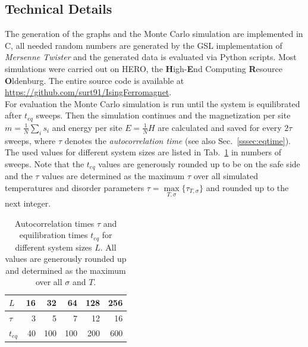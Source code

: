 \subsection{Technical Details}
    The generation of the graphs and the Monte Carlo simulation are implemented
    in C, all needed random numbers are generated by the GSL \cite{GSL}
    implementation of \emph{Mersenne Twister} \cite{Matsumoto1998} and
    the generated data is evaluated via Python scripts.
    Most simulations were carried out on HERO, the \textbf{H}igh-\textbf{E}nd
    Computing \textbf{R}esource \textbf{O}ldenburg.
    The entire source code is available at \url{https://github.com/surt91/IsingFerromagnet}.\\

    For evaluation the Monte Carlo simulation is run until the system
    is equilibrated after \(t_{eq}\) sweeps. Then the simulation continues
    and the magnetization per site \(m=\frac{1}{N}\sum_i s_i\) and energy
    per site \(E=\frac{1}{N} H\) are calculated and saved for every
    \(2\tau\) sweeps, where \(\tau\) denotes the \emph{autocorrelation time}
    (see also Sec.\ \ref{sssec:eqtime}). The used values for different system sizes
    are listed in Tab.\ \ref{tab:tauAndTeq} in numbers of sweeps. Note that
    the \(t_{eq}\) values are generously rounded up to be on the safe side
    and the \(\tau\) values are determined as the maximum \(\tau\) over all
    simulated temperatures and disorder parameters \(\tau = \underset{T,\sigma}{\max} \{\tau_{T,\sigma}\}\)
    and rounded up to the next integer.
    \begin{table}[htbp]
        \center
        \begin{tabular}{l r r r r r}
            \toprule
            \(L\)    & 16 &  32 &  64 & 128 & 256\\
            \midrule
            \(\tau\) &  3 &   5 &   7 &  12 &  16\\
            \(t_{eq}\) & 40 & 100 & 100 & 200 & 600\\
            \bottomrule
        \end{tabular}
        \caption[Autocorrelation Times $\tau$ and Equilibration Times
            $t_{eq}$ for Different System Sizes $L$]{
            Autocorrelation times $\tau$ and equilibration times
            $t_{eq}$ for different system sizes $L$. All values are generously
            rounded up and determined as the maximum over all \(\sigma\) and \(T\).
        }
        \label{tab:tauAndTeq}
    \end{table}\\
